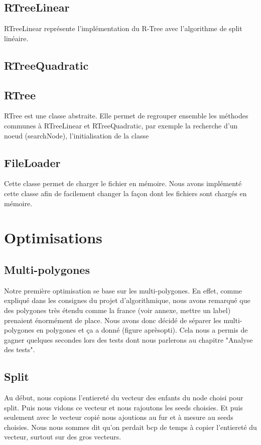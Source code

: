 \documentclass[utf8]{article}
\begin{document}
\begin{large}
  \subsection{RTreeLinear}\label{RTreeLinear}
  \par
  \indent
  RTreeLinear représente l'implémentation du R-Tree avec l'algorithme de split linéaire.
  \subsection{RTreeQuadratic}\label{RTreeQ}

  \subsection{RTree}
  \par
  \indent
  RTree est une classe abstraite. Elle permet de regrouper ensemble les méthodes
  communes à RTreeLinear et RTreeQuadratic, par exemple la
  recherche d'un noeud (searchNode), l'initialisation de la classe


  \subsection{FileLoader}
  \par
  \indent
  Cette classe permet de charger le fichier en mémoire. Nous avons implémenté
  cette classe afin de facilement changer la façon dont les fichiers sont chargés
  en mémoire.

  \section{Optimisations}
  \subsection{Multi-polygones}
  \par
  \indent
  Notre première optimisation se base sur les multi-polygones. En effet, comme
  expliqué dans les consignes du projet d'algorithmique, nous avons remarqué que
  des polygones très étendu comme la france (voir annexe, mettre un label)
  prenaient énormément de place. Nous avons donc décidé de séparer les
  multi-polygones en polygones et ça a donné (figure aprèsopti). Cela nous a
  permis de gagner quelques secondes lors des tests dont nous parlerons au
  chapitre "Analyse des tests".

  \subsection{Split}
  \par
  \indent
  Au début, nous copions l'entiereté du vecteur des enfants du node choisi pour
  split. Puis nous vidons ce vecteur et nous rajoutons les seeds choisies. Et puis
  seulement avec le vecteur copié nous ajoutions au fur et à mesure au seeds
  choisies. Nous nous sommes dit qu'on perdait bcp de temps à copier l'entiereté
  du vecteur, surtout sur des gros vecteurs.


\end{large}
\end{document}
